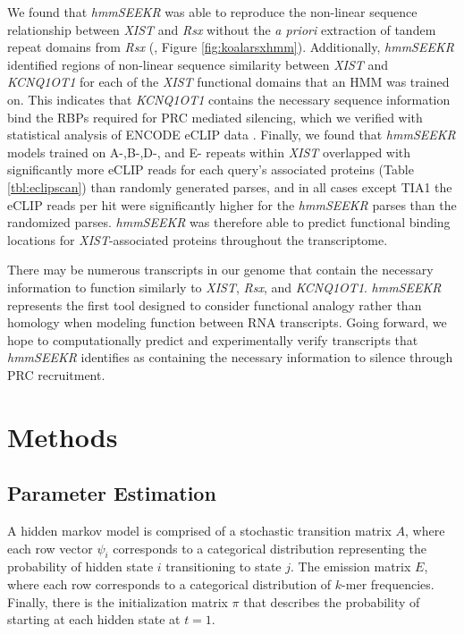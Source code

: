 We found that \emph{hmmSEEKR} was able to reproduce the non-linear sequence relationship between \emph{XIST} and \emph{Rsx} without the \emph{a priori} extraction of tandem repeat domains from \emph{Rsx} (\cite{Sprague2019NonlinearDomains}, Figure \ref{fig:koalarsxhmm}). Additionally, \emph{hmmSEEKR} identified regions of non-linear sequence similarity between \emph{XIST} and \emph{KCNQ1OT1} for each of the \emph{XIST} functional domains that an HMM was trained on. This indicates that \emph{KCNQ1OT1} contains the necessary sequence information bind the RBPs required for PRC mediated silencing, which we verified with statistical analysis of ENCODE eCLIP data \cite{VanNostrand2016RobusteCLIP}. Finally, we found that \emph{hmmSEEKR} models trained on A-,B-,D-, and E- repeats within \emph{XIST} overlapped with significantly more eCLIP reads for each query's associated proteins (Table \ref{tbl:eclipscan}) than randomly generated parses, and in all cases except TIA1 the eCLIP reads per hit were significantly higher for the \emph{hmmSEEKR} parses than the randomized parses. \emph{hmmSEEKR} was therefore able to predict functional binding locations for \emph{XIST}-associated proteins throughout the transcriptome. 

There may be numerous transcripts in our genome that contain the necessary information to function similarly to \textit{XIST}, \textit{Rsx}, and \textit{KCNQ1OT1}. \textit{hmmSEEKR} represents the first tool designed to consider functional analogy rather than homology when modeling function between RNA transcripts. Going forward, we hope to computationally predict and experimentally verify transcripts that \textit{hmmSEEKR} identifies as containing the necessary information to silence through PRC recruitment. 




\section{Methods}

\subsection{Parameter Estimation}
A hidden markov model is comprised of a stochastic transition matrix $A$, where each row vector $\psi_i$ corresponds to a categorical distribution representing the probability of hidden state $i$ transitioning to state $j$. The emission matrix $E$, where each row corresponds to a categorical distribution of $k$-mer frequencies. Finally, there is the initialization matrix $\pi$ that describes the probability of starting at each hidden state at $t=1$.
